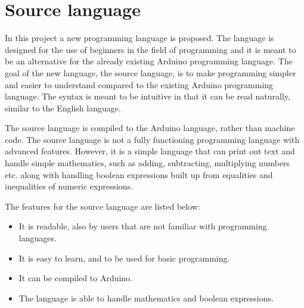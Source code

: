 \chapter{Source language}\label{analysis:source-language}
In this project a new programming language is proposed. The language is designed for the use of beginners in the field of programming and it is meant  to be an alternative for the already existing Arduino programming language.
The goal of the new language, the source language, is to make programming simpler and easier to understand compared to the existing Arduino programming language. The syntax is meant to be intuitive in that it can be read naturally, similar to the English language.

The source language is compiled to the Arduino language, rather than machine code. The source language is not a fully functioning programming language with advanced features. However, it is a simple language that can print out text and handle simple mathematics, such as adding, subtracting, multiplying numbers etc. along with handling boolean expressions built up from equalities and inequalities of numeric expressions.

The features for the source language are listed below:
\begin{itemize}
	\item It is readable, also by users that are not familiar with programming languages.
	\item It is easy to learn, and to be used for basic programming.
	\item It can be compiled to Arduino.
	\item The language is able to handle mathematics and boolean expressions.
\end{itemize}